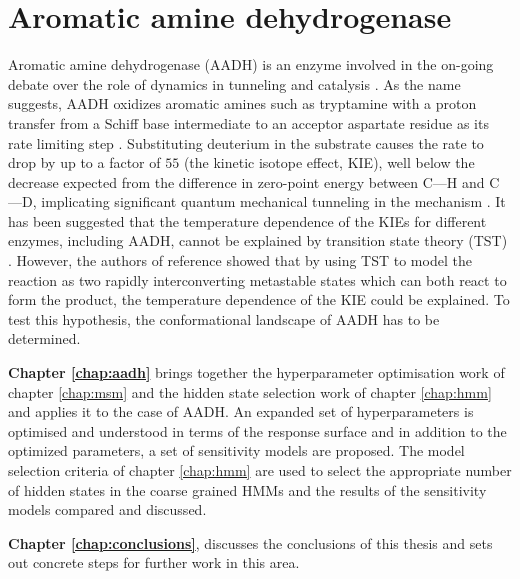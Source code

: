 \section{Aromatic amine dehydrogenase}
Aromatic amine dehydrogenase (AADH) is an enzyme involved in the on-going debate over the role of dynamics in tunneling and catalysis \cite{glowackiTakingOckhamRazor2012b,glowackiProteinDynamicsEnzyme2012a,mcgeaghProteinDynamicsEnzyme2011}. As the name suggests, AADH oxidizes aromatic amines such as tryptamine with a proton transfer from a Schiff base intermediate to an acceptor aspartate residue as its rate limiting step \cite{masgrauAtomicDescriptionEnzyme2006}.  Substituting deuterium in the substrate causes the rate to drop by up to a factor of $55$ (the kinetic isotope effect, KIE), well below the decrease expected from the difference in zero-point energy between C---H and C---D, implicating significant quantum mechanical tunneling in the mechanism \cite{masgrauAtomicDescriptionEnzyme2006, klinmanbeyond2009}. It has been suggested that the temperature dependence of the KIEs for different enzymes, including AADH, cannot be explained by transition state theory (TST) \cite{agrawalVibrationallyEnhancedHydrogen2004,kohenEnzymeCatalysisClassical1998}. However, the authors of reference \cite{glowackiProteinDynamicsEnzyme2012a} showed that by using TST to model the reaction as two rapidly interconverting metastable states which can both react to form the product, the temperature dependence of the KIE could be explained. To test this hypothesis, the conformational landscape of AADH has to be determined. 

\textbf{Chapter \ref{chap:aadh}} brings together the hyperparameter optimisation work of chapter  \ref{chap:msm} and the hidden state selection work of chapter \ref{chap:hmm} and applies it to the case of AADH. An expanded set of hyperparameters is optimised and understood in terms of the response surface and in addition to the optimized parameters, a set of sensitivity models are proposed. The model selection criteria of chapter \ref{chap:hmm} are used to select the appropriate number of hidden states in the coarse grained HMMs and the results of the sensitivity models compared and discussed. 

\textbf{Chapter \ref{chap:conclusions}}, discusses the conclusions of this thesis and sets out concrete steps for further work in this area. 





